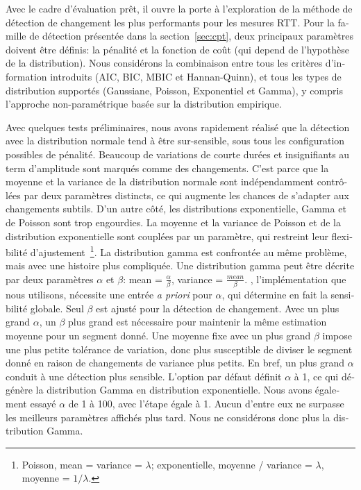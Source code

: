 \begin{otherlanguage}{french}
Avec le cadre d'évaluation prêt, il ouvre la porte à l'exploration de la méthode de détection de changement 
les plus performants pour les mesures RTT.
Pour la famille de détection présentée dans la section~\ref{sec:cpt}, 
deux principaux paramètres doivent être définis: la pénalité et la fonction de coût (qui depend de l'hypothèse de la distribution).
Nous considérons la combinaison entre tous les critères d'information introduits (AIC, BIC, MBIC et Hannan-Quinn), 
et tous les types de distribution supportés (Gaussiane, Poisson, Exponentiel et Gamma), y compris l'approche non-paramétrique basée sur la distribution empirique.

Avec quelques tests préliminaires, nous avons rapidement réalisé que la détection avec 
la distribution normale tend à être sur-sensible, 
sous tous les configuration possibles de pénalité.
Beaucoup de variations de courte durées et insignifiants au term d'amplitude sont marqués comme des changements.
C'est parce que la moyenne et la variance de la distribution normale sont indépendamment contrôlées par deux paramètres distincts, 
ce qui augmente les chances de s'adapter aux changements subtils.
D'un autre côté, les distributions exponentielle, Gamma et de Poisson sont trop engourdies.
La moyenne et la variance de Poisson et de la distribution exponentielle sont couplées par un paramètre,
qui restreint leur flexibilité d'ajustement~\footnote{Poisson, mean = variance = $\lambda$; exponentielle, moyenne / variance = $\lambda$, moyenne = $1/\lambda$.}.
La distribution gamma est confrontée au même problème, mais avec une histoire plus compliquée.
Une distribution gamma peut être décrite par deux paramètres $\alpha$ et $\beta$: mean = $\frac{\alpha}{\beta}$, variance = $\frac{mean}{\beta}$.
\cite{Killick2013a}, l'implémentation que nous utilisons, nécessite une entrée \textit{a priori} pour $\alpha$, qui détermine en fait la sensibilité globale.
Seul $\beta$ est ajusté pour la détection de changement.
Avec un plus grand $\alpha$, un $\beta$ plus grand est nécessaire pour maintenir la même estimation moyenne pour un segment donné.
Une moyenne fixe avec un plus grand $\beta$ impose une plus petite tolérance de variation, donc plus susceptible de diviser le segment donné en raison de changements de variance plus petits.
En bref, un plus grand $\alpha$ conduit à une détection plus sensible.
L'option par défaut définit $\alpha$ à 1, ce qui dégénère la distribution Gamma en distribution exponentielle.
Nous avons également essayé $\alpha$ de 1 à 100, avec l'étape égale à 1.
Aucun d'entre eux ne surpasse les meilleurs paramètres affichés plus tard.
Nous ne considérons donc plus la distribution Gamma.


\end{otherlanguage}
